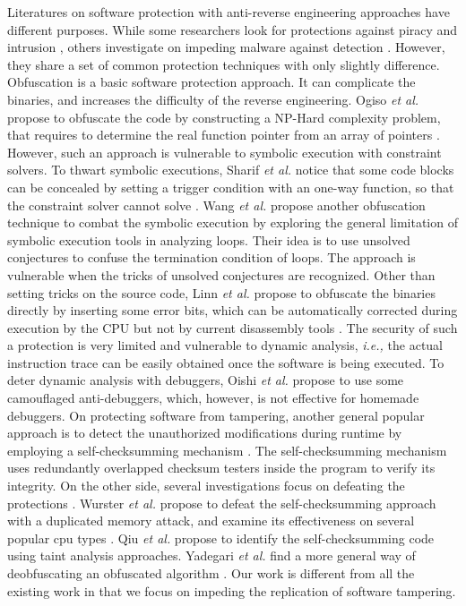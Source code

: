 \documentclass[10pt, conference]{IEEEtran}
\begin{document}
Literatures on software protection with anti-reverse engineering approaches have different purposes.  While some researchers look for protections against piracy \cite{linn2003obfuscation,ogiso2003software} and intrusion \cite{chang2002protecting}, others investigate on impeding malware against detection \cite{moser2007limits,o2011obfuscation,sharif2008impeding}.  However, they share a set of common protection techniques with only slightly difference.  Obfuscation is a basic software protection approach.  It can complicate the binaries, and increases the difficulty of the reverse engineering.  Ogiso \textit{et al.} propose to obfuscate the code by constructing a NP-Hard complexity problem, that requires to determine the real function pointer from an array of pointers \cite{ogiso2003software}.  However, such an approach is vulnerable to symbolic execution with constraint solvers.  To thwart symbolic executions, Sharif \textit{et al.} notice that some code blocks can be concealed by setting a trigger condition with an one-way function, so that the constraint solver cannot solve \cite{sharif2008impeding}.  Wang \textit{et al.} propose another obfuscation technique to combat the symbolic execution by exploring the general limitation of symbolic execution tools in analyzing loops.  Their idea is to use unsolved conjectures \cite{wang2011linear} to confuse the termination condition of loops.  The approach is vulnerable when the tricks of unsolved conjectures are recognized.  Other than setting tricks on the source code, Linn \textit{et al.} propose to obfuscate the binaries directly by inserting some error bits, which can be automatically corrected during execution by the CPU but not by current disassembly tools \cite{linn2003obfuscation}.  The security of such a protection is very limited and vulnerable to dynamic analysis, \textit{i.e.,} the actual instruction trace can be easily obtained once the software is being executed.  To deter dynamic analysis with debuggers, Oishi \textit{et al.} propose to use some camouflaged anti-debuggers, which, however, is not effective for homemade debuggers.  On protecting software from tampering, another general popular approach is to detect the unauthorized modifications during runtime by employing a self-checksumming mechanism \cite{horne2002dynamic, chang2002protecting}.  The self-checksumming mechanism uses redundantly overlapped checksum testers inside the program to verify its integrity.  On the other side, several investigations focus on defeating the protections \cite{wurster2005generic,moser2007limits,qiu2014framework,yadegari2015generic}.  Wurster \textit{et al.} propose to defeat the self-checksumming approach with a duplicated memory attack, and examine its effectiveness on several popular cpu types \cite{wurster2005generic}.  Qiu \textit{et al.} propose to identify the self-checksumming code using taint analysis approaches\cite{qiu2014framework}.  Yadegari \textit{et al.} find a more general way of deobfuscating an obfuscated algorithm \cite {yadegari2015generic}.  Our work is different from all the existing work in that we focus on impeding the replication of software tampering.
\end{document}
